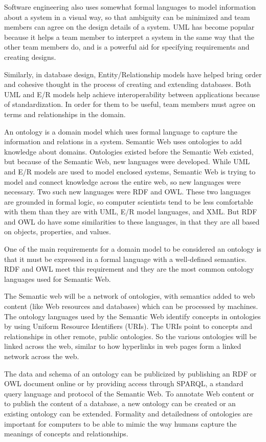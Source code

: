 \documentclass[10pt,journal,compsoc]{IEEEtran}
\begin{document}
Software engineering also uses somewhat formal languages to model information about a system in a visual way, so that ambiguity can be minimized and team members can agree on the design details of a system.  UML  has become popular because it helps a team member to interpret a system in the same way that the other team members do, and is a powerful aid for specifying requirements and creating designs.  

Similarly, in database design, Entity/Relationship models have helped bring order and cohesive thought in the process of creating and extending databases.   Both UML and E/R models help achieve interoperability between applications because of standardization.  In order for them to be useful, team members must agree on terms and relationships in the domain.  

An ontology is a domain model which uses formal language to capture the information and relations in a system.   Semantic Web uses ontologies to add knowledge about domains.  Ontologies existed before the Semantic Web existed, but because of the Semantic Web, new languages were developed.  While UML and E/R models are used to model enclosed systems, Semantic Web is trying to model and connect knowledge across the entire web, so new languages were necessary.  Two such new languages were RDF and OWL.  These two languages are grounded in formal logic, so computer scientists tend to be less comfortable with them than they are with UML, E/R model languages, and XML.  But RDF and OWL do have some similarities to these languages, in that they are all based on objects, properties, and values.

One of the main requirements for a domain model to be considered an ontology is that it must be expressed in a formal language with a well-defined semantics.  RDF and OWL meet this requirement and they are the most common ontology languages used for Semantic Web.  

The Semantic web will be a network of ontologies, with semantics added to web content (like Web resources and databases) which can be processed by machines.  The ontology languages  used by the Semantic Web identify concepts in ontologies by using Uniform Resource Identifiers (URIs).  The URIs point to concepts and relationships in other remote, public ontologies.  So the various ontologies will be linked across the web, similar to how hyperlinks in web pages form a linked network across the web.

The data and schema of an ontology can be publicized by publishing an RDF or OWL document online or by providing access through SPARQL, a standard query language and protocol of the Semantic Web.  To annotate Web content or to publish the content of a database, a new ontology can be created or an existing ontology can be extended.  Formality and detailedness of ontologies are important for computers to be able to mimic the way humans capture the meanings of concepts and relationships.
\end{document}
